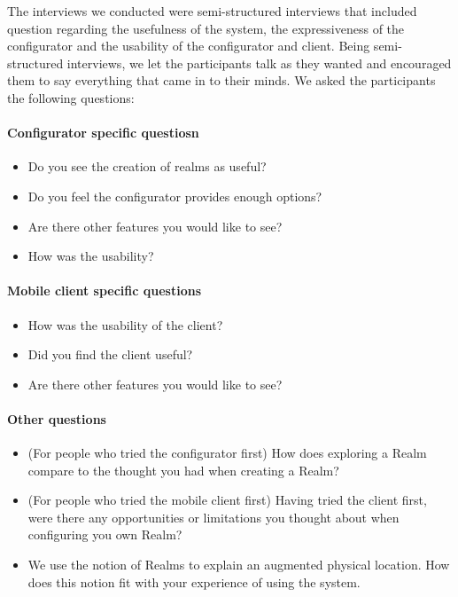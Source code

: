 The interviews we conducted were semi-structured interviews that included question regarding the usefulness of the system, the expressiveness of the configurator and the usability of the configurator and client. Being semi-structured interviews, we let the participants talk as they wanted and encouraged them to say everything that came in to their minds. We asked the participants the following questions:

\paragraph{Configurator specific questiosn} %
\label{par:configurator_specific_questiosn}
\begin{itemize}
	\item Do you see the creation of realms as useful?
	\item Do you feel the configurator provides enough options?
	\item Are there other features you would like to see?
	\item How was the usability?
\end{itemize}

\paragraph{Mobile client specific questions} %
\label{par:mobile_client_specific_questions}
\begin{itemize}
	\item How was the usability of the client?
	\item Did you find the client useful?
	\item Are there other features you would like to see?
\end{itemize}

\paragraph{Other questions} %
\label{par:other_questions}
\begin{itemize}
	\item (For people who tried the configurator first) How does exploring a Realm compare to the thought you had when creating a Realm?
	\item (For people who tried the mobile client first) Having tried the client first, were there any opportunities or limitations you thought about when configuring you own Realm?
	\item We use the notion of Realms to explain an augmented physical location. How does this notion fit with your experience of using the system.
\end{itemize}

